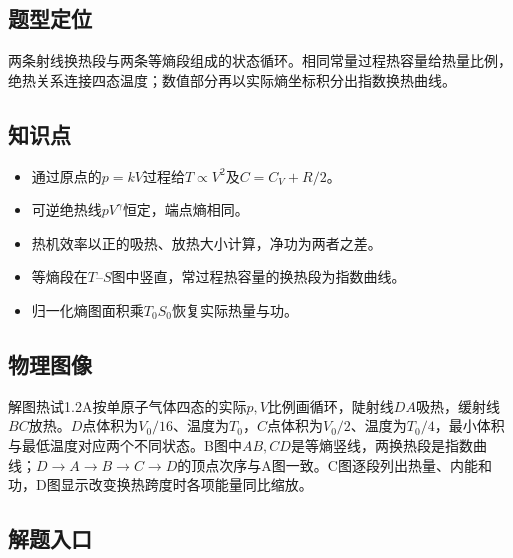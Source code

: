 \documentclass[UTF8,fontset=fandol,a4paper,11pt]{ctexart}
\begin{document}


\subsection*{题型定位}

两条射线换热段与两条等熵段组成的状态循环。相同常量过程热容量给热量比例，绝热关系连接四态温度；数值部分再以实际熵坐标积分出指数换热曲线。



\subsection*{知识点}

\begin{itemize}
\item 通过原点的$p=kV$过程给$T\propto V^2$及$C=C_V+R/2$。
\item 可逆绝热线$pV^\gamma$恒定，端点熵相同。
\item 热机效率以正的吸热、放热大小计算，净功为两者之差。
\item 等熵段在$T$--$S$图中竖直，常过程热容量的换热段为指数曲线。
\item 归一化熵图面积乘$T_0S_0$恢复实际热量与功。\end{itemize}



\subsection*{物理图像}

解图热试1.2A按单原子气体四态的实际$p,V$比例画循环，陡射线$DA$吸热，缓射线$BC$放热。$D$点体积为$V_0/16$、温度为$T_0$，$C$点体积为$V_0/2$、温度为$T_0/4$，最小体积与最低温度对应两个不同状态。B图中$AB,CD$是等熵竖线，两换热段是指数曲线；$D\to A\to B\to C\to D$的顶点次序与A图一致。C图逐段列出热量、内能和功，D图显示改变换热跨度时各项能量同比缩放。



\subsection*{解题入口}
\end{document}
